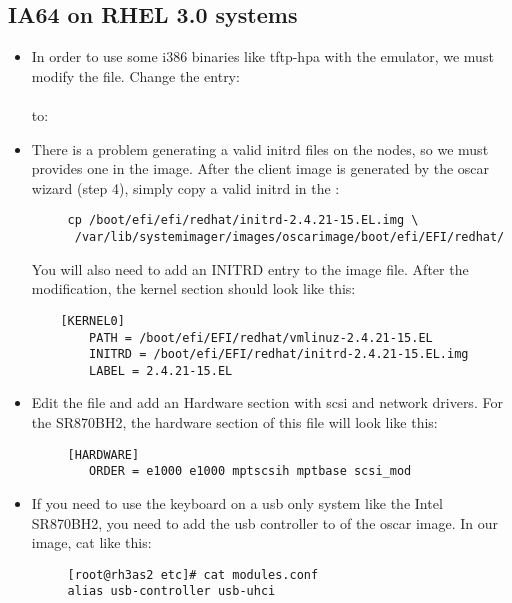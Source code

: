 \subsection{IA64 on RHEL 3.0 systems}
\label{subsec:ia64notes}

\begin{itemize}

\item In order to use some i386 binaries like tftp-hpa with the emulator, 
  we must modify the  file. 
  Change the entry: \ \\
     \ \\ 
  to: \ \\

\item There is a problem generating a valid initrd files on the nodes, so we 
  must provides one in the image.  After the client image is generated by the 
  oscar wizard (step 4), simply copy a valid initrd in the 
  :

  \begin{verbatim}
     cp /boot/efi/efi/redhat/initrd-2.4.21-15.EL.img \
      /var/lib/systemimager/images/oscarimage/boot/efi/EFI/redhat/
  \end{verbatim}

  You will also need to add an INITRD entry to the image
   file. After the modification, the 
  kernel section should look like this:

  \begin{verbatim}
    [KERNEL0]
        PATH = /boot/efi/EFI/redhat/vmlinuz-2.4.21-15.EL
        INITRD = /boot/efi/EFI/redhat/initrd-2.4.21-15.EL.img
        LABEL = 2.4.21-15.EL
  \end{verbatim}

\item Edit the file 
  and add an Hardware section with scsi and network drivers. For the SR870BH2,
  the hardware section of this file will look like this:

  \begin{verbatim}
     [HARDWARE]
        ORDER = e1000 e1000 mptscsih mptbase scsi_mod
  \end{verbatim}

\item If you need to use the keyboard on a usb only system like the Intel 
  SR870BH2, you need to add the usb controller to  
  of the oscar image. In our image, \file{/etc/modules.conf} cat like this:

  \begin{verbatim}
     [root@rh3as2 etc]# cat modules.conf
     alias usb-controller usb-uhci
  \end{verbatim}

\end{itemize}

